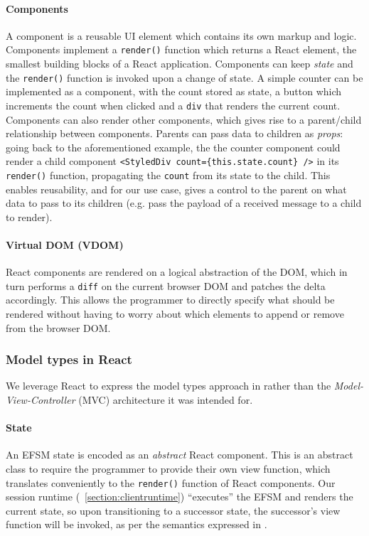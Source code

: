 \documentclass[submission,copyright,creativecommons]{eptcs}
\newcommand{\sectionref}[1]{\textsection~\ref{#1}}
\begin{document}
\paragraph{Components} A component is a reusable UI element which
contains its own markup and logic. Components implement a
\texttt{render()} function which returns a React element, the smallest
building blocks of a React application. Components can keep
\textit{state} and the \texttt{render()} function is invoked upon a
change of state. A simple counter can be implemented as a component,
with the count stored as state, a button which increments the count
when clicked and a \texttt{div} that renders the current
count. Components can also render other components, which gives rise
to a parent/child relationship between components. Parents can pass
data to children as \textit{props}: going back to the aforementioned
example, the the counter component could render a child component
\texttt{<StyledDiv count=\{this.state.count\} />} in its
\texttt{render()} function, propagating the \texttt{count} from its
state to the child. This enables reusability, and for our use case,
gives a control to the parent on what data to pass to its children (e.g. pass the payload of a received message to a child to render).

\paragraph{Virtual DOM (VDOM)} React components are rendered on a logical abstraction of the DOM, which in turn performs a \texttt{diff} on the current browser DOM and patches the delta accordingly. This allows the programmer to directly specify what should be rendered without having to worry about which elements to append or remove from the browser DOM.

\subsubsection{Model types in React}
We leverage React to express the model types approach in \cite{MVU2019} rather than the \textit{Model-View-Controller} (MVC) architecture it was intended for. 

\paragraph{State} An EFSM state is encoded as an \textit{abstract} React component. This is an abstract class to require the programmer to provide their own view function, which translates conveniently to the \texttt{render()} function of React components. Our session runtime (\sectionref{section:clientruntime}) ``executes'' the EFSM and renders the current state, so upon transitioning to a successor state, the successor's view function will be invoked, as per the semantics expressed in \cite{MVU2019}.
\end{document}

